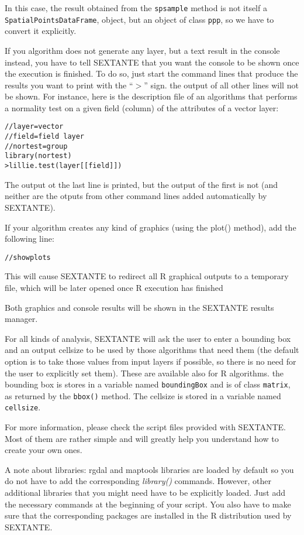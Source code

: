 In this case, the result obtained from the \texttt{spsample} method is not itself a \texttt{SpatialPointsDataFrame}, object, but an object of class \texttt{ppp}, so we have to convert it explicitly.

If you algorithm does not generate any layer, but a text result in the console instead, you have to tell SEXTANTE that you want the console to be shown once the execution is finished. To do so, just start the command lines that produce the results you want to print with the ``$>$'' sign. the output of all other lines will not be shown. For instance, here is the description file of an algorithms that performs a normality test on a given field (column) of the attributes of a vector layer:

\begin{verbatim}
//layer=vector
//field=field layer
//nortest=group
library(nortest)
>lillie.test(layer[[field]]) 	
\end{verbatim}

The output ot the last line is printed, but the output of the first is not (and neither are the otputs from other command lines added automatically by SEXTANTE).

If your algorithm creates any kind of graphics (using the plot() method), add the following line:

\begin{verbatim}
//showplots
\end{verbatim}

This will cause SEXTANTE to redirect all R graphical outputs to a temporary file, which will be later opened once R execution has finished

Both graphics and console results will be shown in the SEXTANTE results manager.

For all kinds of analysis, SEXTANTE will ask the user to enter a bounding box and an output cellsize to be used by those algorithms that need them (the default option is to take those values from input layers if possible, so there is no need for the user to explicitly set them). These are available also for R algorithms. the bounding box is stores in a variable named \texttt{boundingBox} and is of class \texttt{matrix}, as returned by the \texttt{bbox()} method. The cellsize is stored in a variable named \texttt{cellsize}.

For more information, please check the script files provided with SEXTANTE. Most of them are rather simple and will greatly help you understand how to create your own ones.

A note about libraries: rgdal and maptools libraries are loaded by default so you do not have to add the corresponding \emph{library()} commands. However, other additional libraries that you might need have to be explicitly loaded. Just add the necessary commands at the beginning of your script. You also have to make sure that the corresponding packages are installed in the R distribution used by SEXTANTE.











